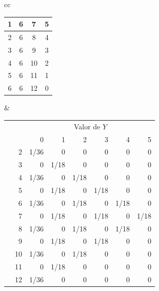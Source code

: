 \begin{ejemplo}
\begin{table}[p]
\begin{center}
\begin{tabular}{cc}
{\begin{tabular}{|c|c|c|c|}
    1 &   6 &   7 &   5 \\ \hline
    2 &   6 &   8 &   4 \\ \hline
    3 &   6 &   9 &   3 \\ \hline
    4 &   6 &  10 &   2 \\ \hline
    5 &   6 &  11 &   1 \\ \hline
    6 &   6 &  12 &   0 \\
   \hline
\end{tabular}
}
&
\begin{tabular}[b]{c|r|r|r|r|r|r|r|}
  \multicolumn{1}{c}{}&\multicolumn{1}{c}{}&\multicolumn{6}{c}{Valor de $Y$}\\
  \cline{3-8}
  \multicolumn{1}{c}{}
  && 0 & 1 & 2 & 3 & 4 & 5 \\  \cline{2-8}
  \multirow{10}{*}{
  \rotatebox{90}{Valor de $X$}
  }
    &   2 & 1/36 & 0 & 0 & 0 & 0 & 0 \\ \cline{2-8}
    &   3 & 0 & 1/18 & 0 & 0 & 0 & 0 \\ \cline{2-8}
    &   4 & 1/36 & 0 & 1/18 & 0 & 0 & 0 \\ \cline{2-8}
    &   5 & 0 & 1/18 & 0 & 1/18 & 0 & 0 \\ \cline{2-8}
    &   6 & 1/36 & 0 & 1/18 & 0 & 1/18 & 0 \\ \cline{2-8}
    &   7 & 0 & 1/18 & 0 & 1/18 & 0 & 1/18 \\ \cline{2-8}
    &   8 & 1/36 & 0 & 1/18 & 0 & 1/18 & 0 \\ \cline{2-8}
    &   9 & 0 & 1/18 & 0 & 1/18 & 0 & 0 \\ \cline{2-8}
    &   10 & 1/36 & 0 & 1/18 & 0 & 0 & 0 \\ \cline{2-8}
    &   11 & 0 & 1/18 & 0 & 0 & 0 & 0 \\ \cline{2-8}
    &   12 & 1/36 & 0 & 0 & 0 & 0 & 0 \\
   \cline{2-8}
\end{tabular}
\end{tabular}


\end{center}
\end{table}
\end{ejemplo}
